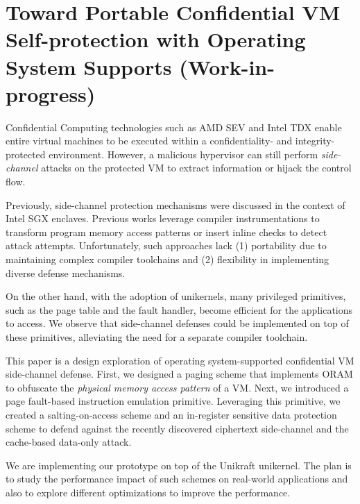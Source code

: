 \chapter{Toward Portable Confidential VM Self-protection with Operating System Supports (Work-in-progress)}
\renewcommand{\thename}{\oblivm}
\label{chap:oblivm}

Confidential Computing technologies such as AMD SEV and Intel TDX enable entire virtual machines to be executed within a confidentiality- and integrity-protected environment. However, a malicious hypervisor can still perform \emph{side-channel} attacks on the protected VM to extract information or hijack the control flow.

Previously, side-channel protection mechanisms were discussed in the context of Intel SGX enclaves. Previous works leverage compiler instrumentations to transform program memory access patterns or insert inline checks to detect attack attempts.
Unfortunately, such approaches lack (1) portability due to maintaining complex compiler toolchains and (2) flexibility in implementing diverse defense mechanisms.

On the other hand, with the adoption of unikernels, many privileged primitives, such as the page table and the fault handler, become efficient for the applications to access.
We observe that side-channel defenses could be implemented on top of these primitives, alleviating the need for a separate compiler toolchain.

This paper is a design exploration of operating system-supported confidential VM side-channel defense.
First, we designed a paging scheme that implements ORAM to obfuscate the \emph{physical memory access pattern} of a VM. Next, we introduced a page fault-based instruction emulation primitive. Leveraging this primitive, we created a salting-on-access scheme and an in-register sensitive data protection scheme to defend against the recently discovered ciphertext side-channel and the cache-based data-only attack.

We are implementing our prototype on top of the Unikraft unikernel. The plan is to study the performance impact of such schemes on real-world applications and also to explore different optimizations to improve the performance.



